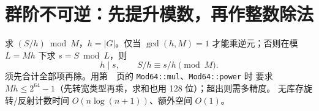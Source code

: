 \section{群阶不可逆：先提升模数，再作整数除法}\label{knowledge-orbits-modular}
求 $(S/h)\bmod M$，$h=|G|$。仅当 $\gcd(h,M)=1$ 才能乘逆元；否则在模 $L=Mh$ 下求 $s=S\bmod L$，则
\[
h\mid s,\qquad S/h\equiv s/h\pmod M.
\]
须先合计全部项再除。用第~\pageref{compact-Mod64}~页的 \texttt{Mod64::mul}、\texttt{Mod64::power} 时
要求 $Mh\le2^{64}-1$（先转宽类型再乘，求和也用 128 位）；超出则需多精度。
无库存旋转/反射计数时间 $O(n\log(n+1))$、额外空间 $O(1)$。
\label{end-orbits-supplement}
